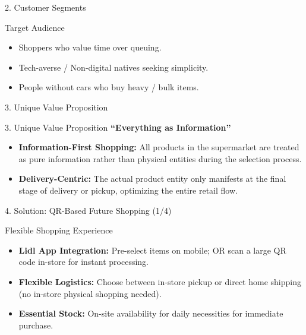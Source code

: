 \documentclass[aspectratio=169]{beamer}
\begin{document}
\begin{frame}{2. Customer Segments}
    \begin{block}{Target Audience}
        \begin{itemize}
            \item Shoppers who value time over queuing.
            \item Tech-averse / Non-digital natives seeking simplicity.
            \item People without cars who buy heavy / bulk items.
        \end{itemize}
    \end{block}
\end{frame}

\begin{frame}{3. Unique Value Proposition}
    \begin{block}{3. Unique Value Proposition}
        \centering \Large \textbf{``Everything as Information''}
    \end{block}

    \vspace{20pt}

    \begin{itemize}
        \item \textbf{Information-First Shopping:} All products in the supermarket are treated as pure information rather than physical entities during the selection process.
        \item \textbf{Delivery-Centric:} The actual product entity only manifests at the final stage of delivery or pickup, optimizing the entire retail flow.
    \end{itemize}
\end{frame}

\begin{frame}{4. Solution: QR-Based Future Shopping (1/4)}
    \begin{block}{Flexible Shopping Experience}
        \begin{itemize}
            \item \textbf{Lidl App Integration:} Pre-select items on mobile; OR scan a large QR code in-store for instant processing.
            \item \textbf{Flexible Logistics:} Choose between in-store pickup or direct home shipping (no in-store physical shopping needed).
            \item \textbf{Essential Stock:} On-site availability for daily necessities for immediate purchase.
        \end{itemize}
    \end{block}
\end{frame}
\end{document}
